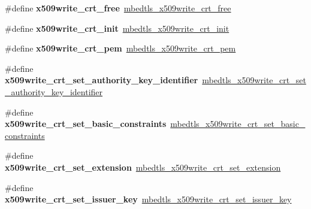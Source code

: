 \begin{DoxyCompactItemize}
\item 
\mbox{\label{compat-1_83_8h_a3f65cd76b058c004714c4475b756eaac}} 
\#define {\bfseries x509write\+\_\+crt\+\_\+free}~\mbox{\hyperlink{x509__crt_8h_aacd2986253f977770c2353a54cf2e670}{mbedtls\+\_\+x509write\+\_\+crt\+\_\+free}}
\item 
\mbox{\label{compat-1_83_8h_a7592282e212638632ed7cbb47fa7ac99}} 
\#define {\bfseries x509write\+\_\+crt\+\_\+init}~\mbox{\hyperlink{x509__crt_8h_a9da6bf87b583e0eea76bc3ca21a1f3dd}{mbedtls\+\_\+x509write\+\_\+crt\+\_\+init}}
\item 
\mbox{\label{compat-1_83_8h_a98107c20c55c5a5e6f9edf4eb2a15ef4}} 
\#define {\bfseries x509write\+\_\+crt\+\_\+pem}~\mbox{\hyperlink{x509__crt_8h_a2b1106722175cf04ef07313626728886}{mbedtls\+\_\+x509write\+\_\+crt\+\_\+pem}}
\item 
\mbox{\label{compat-1_83_8h_a0f85d09a69f6a330dcffe4a8b9fe896a}} 
\#define {\bfseries x509write\+\_\+crt\+\_\+set\+\_\+authority\+\_\+key\+\_\+identifier}~\mbox{\hyperlink{x509__crt_8h_a7e43c8a91bdd1f5c0b8f729ef602b624}{mbedtls\+\_\+x509write\+\_\+crt\+\_\+set\+\_\+authority\+\_\+key\+\_\+identifier}}
\item 
\mbox{\label{compat-1_83_8h_a041063a49ad9d0bf1ad9e89ffb394bc3}} 
\#define {\bfseries x509write\+\_\+crt\+\_\+set\+\_\+basic\+\_\+constraints}~\mbox{\hyperlink{x509__crt_8h_ae13aefe1e123dcbcefe1eccd7968b6d2}{mbedtls\+\_\+x509write\+\_\+crt\+\_\+set\+\_\+basic\+\_\+constraints}}
\item 
\mbox{\label{compat-1_83_8h_a01c6f281af6d0e3719d14289074a6208}} 
\#define {\bfseries x509write\+\_\+crt\+\_\+set\+\_\+extension}~\mbox{\hyperlink{x509__crt_8h_a57804fd223bfd8601bdc76550385a50b}{mbedtls\+\_\+x509write\+\_\+crt\+\_\+set\+\_\+extension}}
\item 
\mbox{\label{compat-1_83_8h_a0b0290b81dc06cb28fb5dcb6abcb0281}} 
\#define {\bfseries x509write\+\_\+crt\+\_\+set\+\_\+issuer\+\_\+key}~\mbox{\hyperlink{x509__crt_8h_a416f26146d68bb79aac90e8e48bbe7df}{mbedtls\+\_\+x509write\+\_\+crt\+\_\+set\+\_\+issuer\+\_\+key}}
\item 
\mbox{\label{compat-1_83_8h_af172c1d7b28a03c001b15ffd85d8a18a}} 

\end{DoxyCompactItemize}
